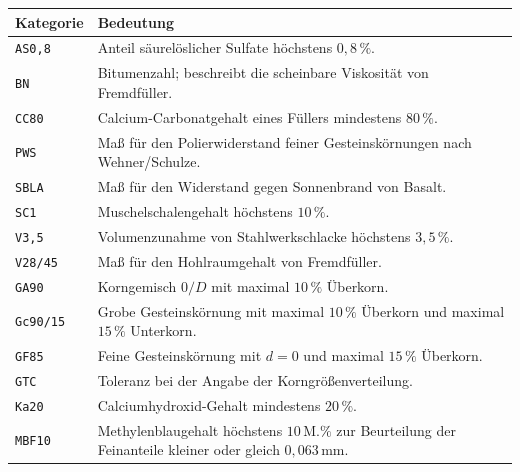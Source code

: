 \documentclass[
  12pt,
  a4paper,
  oneside
]{scrreprt}
\begin{document}
\begin{longtable}{
  >{\centering\arraybackslash}p{}
  >{\raggedright\arraybackslash}p{}
}
\toprule
\textbf{Kategorie} &
\textbf{Bedeutung} \\
\midrule
\endhead

\texttt{AS0,8} &
Anteil säurelöslicher Sulfate höchstens $0{,}8\,\%$. \\

\texttt{BN} &
Bitumenzahl; beschreibt die scheinbare Viskosität von Fremdfüller. \\

\texttt{CC80} &
Calcium-Carbonatgehalt eines Füllers mindestens $80\,\%$. \\

\texttt{PWS} &
Maß für den Polierwiderstand feiner Gesteinskörnungen nach
Wehner/Schulze. \\

\texttt{SBLA} &
Maß für den Widerstand gegen Sonnenbrand von Basalt. \\

\texttt{SC1} &
Muschelschalengehalt höchstens $10\,\%$. \\

\texttt{V3,5} &
Volumenzunahme von Stahlwerkschlacke höchstens $3{,}5\,\%$. \\

\texttt{V28/45} &
Maß für den Hohlraumgehalt von Fremdfüller. \\

\texttt{GA90} &
Korngemisch $0/D$ mit maximal $10\,\%$ Überkorn. \\

\texttt{Gc90/15} &
Grobe Gesteinskörnung mit maximal $10\,\%$ Überkorn und maximal
$15\,\%$ Unterkorn. \\

\texttt{GF85} &
Feine Gesteinskörnung mit $d=0$ und maximal $15\,\%$ Überkorn. \\

\texttt{GTC} &
Toleranz bei der Angabe der Korngrößenverteilung. \\

\texttt{Ka20} &
Calciumhydroxid-Gehalt mindestens $20\,\%$. \\

\texttt{MBF10} &
Methylenblaugehalt höchstens $10\,\mathrm{M.\%}$ zur Beurteilung der
Feinanteile kleiner oder gleich $0{,}063\,\mathrm{mm}$. \\

\bottomrule
\end{longtable}
\end{document}
